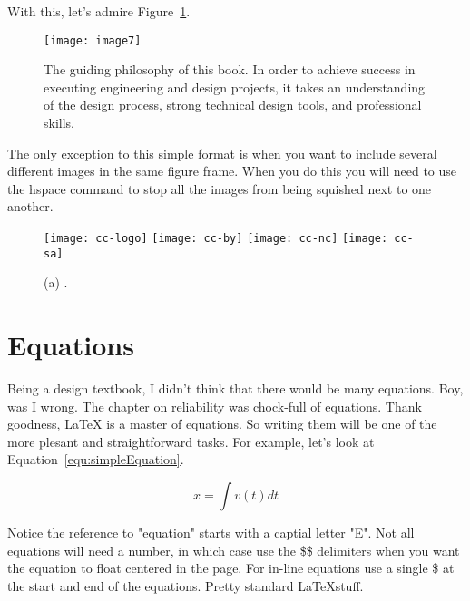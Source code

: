 With this, let's admire Figure~\ref{table:bookPhilosophy}. 

\begin{figure}[h]
\texttt{[image: image7]}

\caption{The guiding philosophy of this book. In order to
achieve success in executing engineering and design projects, it takes
an understanding of the design process, strong technical design tools,
and professional skills.}
\label{table:bookPhilosophy}
\end{figure}

The only exception to this simple format is when you want to include
several different images in the same figure frame.  When you do this
you will need to use the hspace command to stop all the images
from being squished next to one another.

\begin{figure}[h]
\hspace{1cm}
\texttt{[image: cc-logo]}
\hspace{1cm}
\texttt{[image: cc-by]}
\hspace{1cm}
\texttt{[image: cc-nc]}
\hspace{1cm}
\texttt{[image: cc-sa]}
\caption{(a) .}
\label{figure:howToCommonCollectiveLicense}
\end{figure}

\section{Equations}
\label{section:howToEquations}

Being a design textbook, I didn't think that there would be many equations.  Boy, was
I wrong.  The chapter on reliability was chock-full of equations.  Thank goodness, \LaTeX
is a master of equations.  So writing them will be one of the more plesant and straightforward
tasks. For example, let's look at Equation~\ref{equ:simpleEquation}.

\begin{equation}
\label{equ:simpleEquation}
x = \int v(t) dt
\end{equation}

Notice the reference to "equation" starts with a captial letter "E".  Not all equations will
need a number, in which case use the \$\$ delimiters when you want the equation to
float centered in the page.  For in-line equations use a single \$ at the start and end
of the equations.  Pretty standard \LaTeX stuff.

